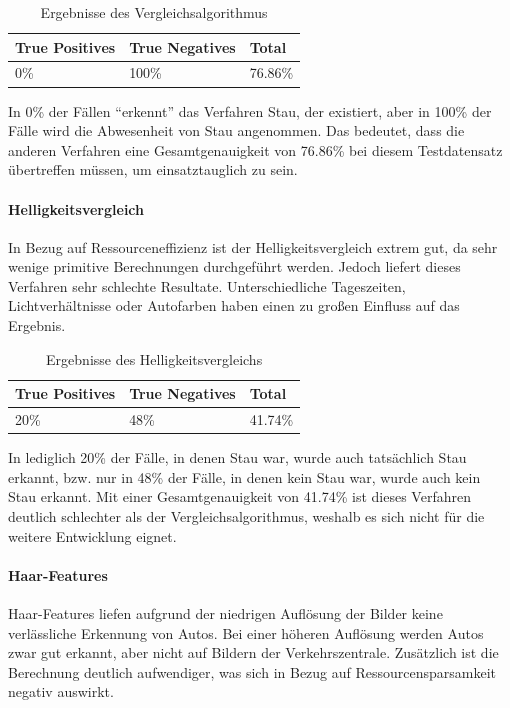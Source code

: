 \begin{table}[ht]
  \centering
\scriptsize
    \begin{tabular}{ | l | l | l |}
    \hline
		True Positives & True Negatives & Total \\ \hline
    0\% &
		100\% &
		76.86\% \\
    \hline
    \end{tabular}
		\caption{Ergebnisse des Vergleichsalgorithmus}
\end{table}

In 0\% der Fällen "`erkennt"' das Verfahren Stau, der existiert, aber in 100\% der Fälle wird die Abwesenheit von Stau angenommen. Das bedeutet, dass die anderen Verfahren eine Gesamtgenauigkeit von 76.86\% bei diesem Testdatensatz übertreffen müssen, um einsatztauglich zu sein.

\paragraph{Helligkeitsvergleich}
In Bezug auf Ressourceneffizienz ist der Helligkeitsvergleich extrem gut, da sehr wenige primitive Berechnungen durchgeführt werden.
Jedoch liefert dieses Verfahren sehr schlechte Resultate. Unterschiedliche Tageszeiten, Lichtverhältnisse oder Autofarben haben einen zu großen Einfluss auf das Ergebnis.

\begin{table}[ht]
  \centering
\scriptsize
    \begin{tabular}{ | l | l | l |}
    \hline
		True Positives & True Negatives & Total \\ \hline
    20\% &
		48\% &
		41.74\% \\
    \hline
    \end{tabular}
  \caption{Ergebnisse des Helligkeitsvergleichs}
\end{table}

In lediglich 20\% der Fälle, in denen Stau war, wurde auch tatsächlich Stau erkannt, bzw. nur in 48\% der Fälle, in denen kein Stau war, wurde auch kein Stau erkannt.
Mit einer Gesamtgenauigkeit von 41.74\% ist dieses Verfahren deutlich schlechter als der Vergleichsalgorithmus, weshalb es sich nicht für die weitere Entwicklung eignet.

\paragraph{Haar-Features}
Haar-Features liefen aufgrund der niedrigen Auflösung der Bilder keine verlässliche Erkennung von Autos. Bei einer höheren Auflösung werden Autos zwar gut erkannt, aber nicht auf Bildern der Verkehrszentrale. Zusätzlich ist die Berechnung deutlich aufwendiger, was sich in Bezug auf Ressourcensparsamkeit negativ auswirkt.


